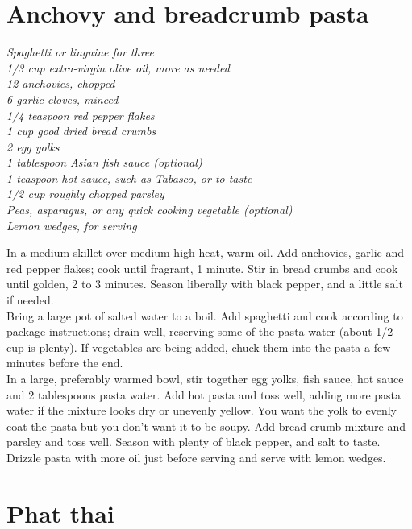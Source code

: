 \documentclass{tufte-book}
\begin{document}
\section{Anchovy and breadcrumb pasta }

\emph{Spaghetti or linguine for three
\\1/3 cup extra-virgin olive oil, more as needed
\\12 anchovies, chopped
\\6 garlic cloves, minced
\\1/4 teaspoon red pepper flakes
\\1 cup good dried bread crumbs
\\2 egg yolks
\\1 tablespoon Asian fish sauce (optional)
\\1 teaspoon hot sauce, such as Tabasco, or to taste
\\1/2 cup roughly chopped parsley
\\ Peas, asparagus, or any quick cooking vegetable (optional)
\\Lemon wedges, for serving}

In a medium skillet over medium-high heat, warm oil. Add anchovies, garlic and red pepper flakes; cook until fragrant, 1 minute. Stir in bread crumbs and cook until golden, 2 to 3 minutes. Season liberally with black pepper, and a little salt if needed.
\\Bring a large pot of salted water to a boil. Add spaghetti and cook according to package instructions; drain well, reserving some of the pasta water (about 1/2 cup is plenty). If vegetables are being added, chuck them into the pasta a few minutes before the end.
\\In a large, preferably warmed bowl, stir together egg yolks, fish sauce, hot sauce and 2 tablespoons pasta water. Add hot pasta and toss well, adding more pasta water if the mixture looks dry or unevenly yellow. You want the yolk to evenly coat the pasta but you don’t want it to be soupy. Add bread crumb mixture and parsley and toss well. Season with plenty of black pepper, and salt to taste. Drizzle pasta with more oil just before serving and serve with lemon wedges.


\section{Phat thai}
\end{document}
